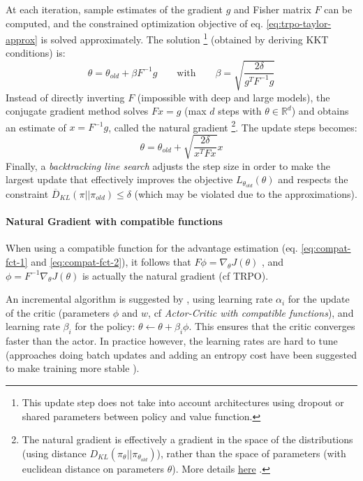 At each iteration, sample estimates of the gradient $g$ and Fisher matrix $F$ can be computed, and the constrained optimization objective of eq. \ref{eq:trpo-taylor-approx} is solved approximately. The solution
\footnote{This update step does not take into account architectures using dropout or shared parameters between policy and value function.}
(obtained by deriving KKT conditions) is:
\[
    \theta = \theta_{old} + \beta F^{-1} g
    \qquad \text{with} \qquad
    \beta = \sqrt{\frac{2\delta}{g^T F^{-1} g}}
\]
Instead of directly inverting $F$ (impossible with deep and large models), the conjugate gradient method solves $Fx=g$ (max $d$ steps with $\theta \in \mathbb{R}^d$) and obtains an estimate of $x=F^{-1}g$, called the natural gradient
\footnote{The natural gradient is effectively a gradient in the space of the distributions (using distance $D_{KL}(\pi_{\theta}||\pi_{\theta_{old}})$), rather than the space of parameters (with euclidean distance on parameters $\theta$). More details \href{https://julien-vitay.net/deeprl/NaturalGradient.html}{here} \cite{blog-natural-gradients}.}.
The update steps becomes:
\[
    \theta = \theta_{old} + \sqrt{\frac{2\delta}{x^T F x}} x
\]
Finally, a \emph{backtracking line search} adjusts the step size in order to make the largest update that effectively improves the objective $L_{\theta_{old}}(\theta)$ and respects the constraint $\overline{D}_{KL}(\pi||\pi_{old}) \leq \delta$ (which may be violated due to the approximations).

\paragraph{Natural Gradient with compatible functions}
When using a compatible function for the advantage estimation (eq. \ref{eq:compat-fct-1} and \ref{eq:compat-fct-2}), it follows that $F \phi = \nabla_\theta J(\theta)$ \demo, and $\phi = F^{-1} \nabla_\theta J(\theta)$ is actually the natural gradient (cf TRPO).

An incremental algorithm is suggested by \cite{bhatnagar2007incremental}, using learning rate $\alpha_i$ for the update of the critic (parameters $\phi$ and $w$, cf \emph{Actor-Critic with compatible functions}), and learning rate $\beta_i$ for the policy: $\theta \leftarrow \theta + \beta_i \phi$. This ensures that the critic converges faster than the actor. In practice however, the learning rates are hard to tune (approaches doing batch updates and adding an entropy cost have been suggested to make training more stable \cite{pajarinen2019compatible}).

